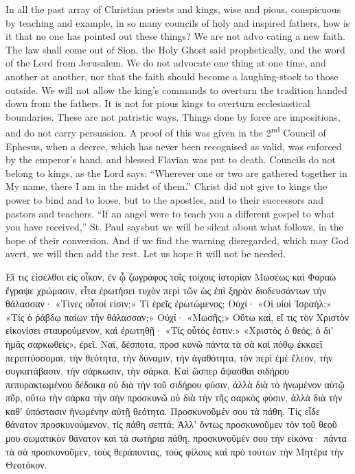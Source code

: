 \documentclass[10pt]{book}
\newcommand{\switchgreek}[1][]{\selectlanguage{polutonikogreek} \switchcolumn*[#1]}
\begin{document}
\begin{paracol}{2}
In all the past array of Christian priests and 
kings, wise and pious, conspicuous by teaching 
and example, in so many councils of holy and 
inspired fathers, how is it that no one has 
pointed out these things? We are not advo 
cating a new faith. The law shall come out of 
Sion, the Holy Ghost said prophetically, and 
the word of the Lord from Jerusalem. We do 
not advocate one thing at one time, and another 
at another, nor that the faith should become a 
laughing-stock to those outside. We will not 
allow the king's commands to overturn the 
tradition handed down from the fathers. It is 
not for pious kings to overturn ecclesiastical 
boundaries. These are not patristic ways. 
Things done by force are impositions, and do 
not carry persuasion. A proof of this was given 
in the 2\textsuperscript{nd} Council of Ephesus, when a decree, 
which has never been recognised as valid, was 
enforced by the emperor's hand, and blessed 
Flavian was put to death. Councils do not 
belong to kings, as the Lord says: ``Wherever 
one or two are gathered together in My name, 
there I am in the midst of them.'' Christ did 
not give to kings the power to bind and to 
loose, but to the apostles, and to their successors
and pastors and teachers. ``If an angel 
were to teach you a different gospel to what 
you have received,'' St. Paul says\textemdash but we will 
be silent about what follows, in the hope of 
their conversion. And if we find the warning 
disregarded, which may God avert, we will 
then add the rest. Let us hope it will not be 
needed. 

\switchgreek

Εἴ τις εἰσέλθοι εἰς οἶκον, ἐν ᾧ ζωγράφος τοῖς τοίχοις ἱστορίαν Μωσέως καὶ
Φαραὼ ἔγραψε χρώμασιν, εἶτα ἐρωτήσει τυχὸν περὶ τῶν ὡς ἐπὶ ξηρὰν διοδευσάντων
τὴν θάλασσαν· «Τίνες οὗτοί εἰσιν;» Τί ἐρεῖς ἐρωτώμενος; Οὐχί· «Οἱ υἱοὶ
Ἰσραήλ;» «Τίς ὁ ῥάβδῳ παίων τὴν θάλασσαν;» Οὐχί· «Μωσῆς;» Οὕτω καί, εἴ τις τὸν
Χριστὸν εἰκονίσει σταυρούμενον, καὶ ἐρωτηθῇ· «Τίς οὗτός ἐστιν;» «Χριστὸς ὁ
θεός, ὁ δι’ ἡμᾶς σαρκωθείς», ἐρεῖ. Ναί, δέσποτα, προσ κυνῶ πάντα τὰ σὰ καὶ
πόθῳ ἐκκαεῖ περιπτύσσομαι, τὴν θεότητα, τὴν δύναμιν, τὴν ἀγαθότητα, τὸν περὶ
ἐμὲ ἔλεον, τὴν συγκατάβασιν, τὴν σάρκωσιν, τὴν σάρκα. Καὶ ὥσπερ ἅψασθαι
σιδήρου πεπυρακτωμένου δέδοικα οὐ διὰ τὴν τοῦ σιδήρου φύσιν, ἀλλὰ διὰ τὸ
ἡνωμένον αὐτῷ πῦρ, οὕτω τὴν σάρκα τὴν σὴν προσκυνῶ οὐ διὰ τὴν τῆς σαρκὸς
φύσιν, ἀλλὰ διὰ τὴν καθ’ ὑπόστασιν ἡνωμένην αὐτῇ θεότητα. Προσκυνοῦμέν σου τὰ
πάθη. Τίς εἶδε θάνατον προσκυνούμενον, τίς πάθη σεπτά; Ἀλλ’ ὄντως προσκυνοῦμεν
τὸν τοῦ θεοῦ μου σωματικὸν θάνατον καὶ τὰ σωτήρια πάθη, προσκυνοῦμέν σου τὴν
εἰκόνα· πάντα τὰ σὰ προσκυνοῦμεν, τοὺς θεράποντας, τοὺς φίλους καὶ πρὸ τούτων
τὴν Μητέρα τὴν Θεοτόκον. 


\end{paracol}
\end{document}
